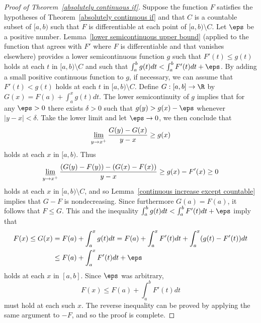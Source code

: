 \begin{proof}[Proof of Theorem~\ref{absolutely continuous if}]
Suppose the function $F$ satisfies the hypotheses of Theorem~\ref{absolutely continuous if} and that $C$ is a countable subset of $[a,b)$ such that $F$ is differentiable at each point of $[a,b)\setminus C$. Let $\eps$ be a positive number. Lemma~\ref{lower semicontinuous upper bound} (applied to the function that agrees with $F'$ where $F$ is differentiable and that vanishes elsewhere) provides a lower semicontinuous function $g$ such that $F'(t)\leq g(t)$ holds at each $t$ in $[a,b)\setminus C$ and such that $\int_a^bg(t)dt<\int_a^bF'(t)dt+\eps$. By adding a small positive continuous function to $g$, if necessary, we can assume that $F'(t)<g(t)$ holds at each $t$ in $[a,b)\setminus C$. Define $G:[a,b]\to\R$ by $G(x)=F(a)+\int_a^xg(t)dt$. The lower semicontinuity of $g$ implies that for any $\eps>0$ there exists $\delta>0$ such that $g(y)>g(x)-\eps$ whenever $|y-x|<\delta$. Take the lower limit and let $\eps\to 0$, we then conclude that
\[\varliminf_{y\to x^+}\frac{G(y)-G(x)}{y-x}\geq g(x)\]
holds at each $x$ in $[a,b)$. Thus
\[\varliminf_{y\to x^+}\frac{(G(y)-F(y))-(G(x)-F(x))}{y-x}\geq g(x)-F'(x)\geq 0\]
holds at each $x$ in $[a,b)\setminus C$, and so Lemma~\ref{continuous increase except countable} implies that $G-F$ is nondecreasing. Since furthermore $G(a)=F(a)$, it follows that $F\leq G$. This and the inequality $\int_a^bg(t)dt<\int_a^bF'(t)dt+\eps$ imply that
\begin{align*}
F(x)\leq G(x)&=F(a)+\int_a^xg(t)dt=F(a)+\int_a^xF'(t)dt+\int_a^x(g(t)-F'(t))dt\\
&\leq F(a)+\int_a^xF'(t)dt+\eps
\end{align*}
holds at each $x$ in $[a,b]$. Since $\eps$ was arbitrary,
\[F(x)\leq F(a)+\int_a^bF'(t)dt\]
must hold at each such $x$. The reverse inequality can be proved by applying the same argument to $-F$, and so the proof is complete.
\end{proof}

